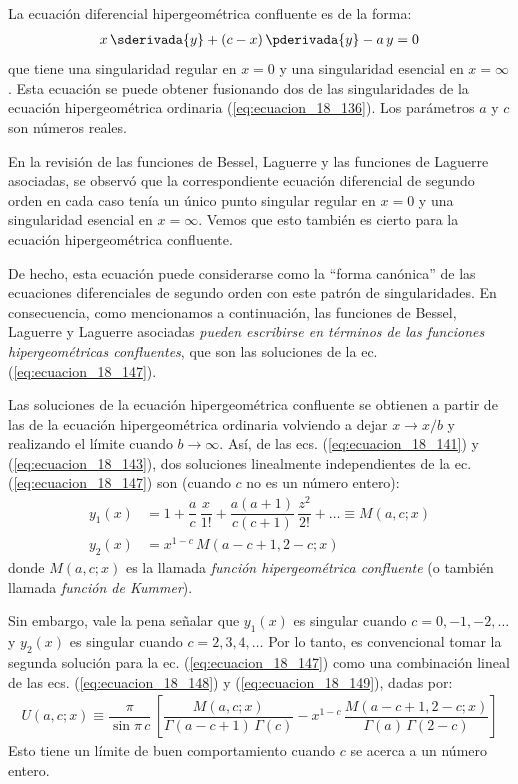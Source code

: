 La ecuación diferencial hipergeométrica confluente es de la forma:
\begin{align}
x \, \sderivada{y} + (c - x) \, \pderivada{y} - a \, y = 0
\label{eq:ecuacion_18_147}
\end{align}
que tiene una singularidad regular en $x = 0$ y una singularidad esencial en $x = \infty$. Esta ecuación se puede obtener fusionando dos de las singularidades de la ecuación hipergeométrica ordinaria (\ref{eq:ecuacion_18_136}). Los parámetros $a$ y $c$ son números reales.
\par
En la revisión de las funciones de Bessel, Laguerre y las funciones de Laguerre asociadas, se observó que la correspondiente ecuación diferencial de segundo orden en cada caso tenía un único punto singular regular en $x = 0$ y una singularidad esencial en $x = \infty$. Vemos que esto también es cierto para la ecuación hipergeométrica confluente.
\par
De hecho, esta ecuación puede considerarse como la \enquote{forma canónica} de las ecuaciones diferenciales de segundo orden con este patrón de singularidades. En consecuencia, como mencionamos a continuación, las funciones de Bessel, Laguerre y Laguerre asociadas \emph{pueden escribirse en términos de las funciones hipergeométricas confluentes}, que son las soluciones de la ec. (\ref{eq:ecuacion_18_147}).
\par
Las soluciones de la ecuación hipergeométrica confluente se obtienen a partir de las de la ecuación hipergeométrica ordinaria volviendo a dejar $x \to x/b$ y realizando el límite cuando $b \to \infty$. Así, de las ecs. (\ref{eq:ecuacion_18_141}) y (\ref{eq:ecuacion_18_143}), dos soluciones linealmente independientes de la ec. (\ref{eq:ecuacion_18_147}) son (cuando $c$ no es un número entero):
\begin{align}
y_{1} (x) &= 1 + \dfrac{a}{c} \, \dfrac{x}{1!} + \dfrac{a (a + 1)}{c (c + 1)} \, \dfrac{z^{2}}{2!} + \ldots \equiv M (a, c; x) \label{eq:ecuacion_18_148} \\[0.5em]
y_{2} (x) &= x^{1-c} \, M(a - c + 1, 2 - c; x) \label{eq:ecuacion_18_149}
\end{align}
donde $M(a, c; x)$ es la llamada \emph{función hipergeométrica confluente} (o también llamada \emph{función de Kummer}).
\par
Sin embargo, vale la pena señalar que $y_{1} (x)$ es singular cuando $c = 0, -1, -2, \ldots$ y $y_{2} (x)$ es singular cuando $c = 2, 3, 4, \ldots$ Por lo tanto, es convencional tomar la segunda solución para la ec. (\ref{eq:ecuacion_18_147}) como una combinación lineal de las ecs. (\ref{eq:ecuacion_18_148}) y (\ref{eq:ecuacion_18_149}), dadas por:
\begin{align*}
U(a, c; x) \equiv \dfrac{\pi}{\sin \pi \, c} \, \left[ \dfrac{M(a, c; x)}{\Gamma (a - c + 1) \, \Gamma (c)} - x^{1-c} \, \dfrac{M(a - c + 1, 2 - c; x)}{\Gamma(a) \, \Gamma (2 - c)} \right]
\end{align*}
Esto tiene un límite de buen comportamiento cuando $c$ se acerca a un número entero.

